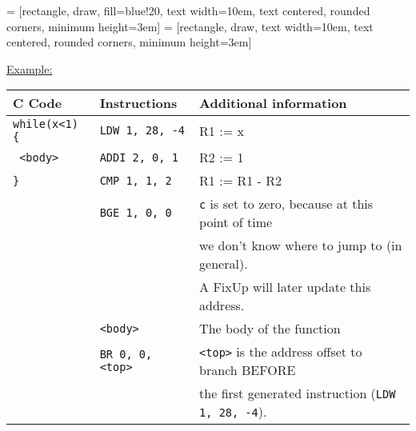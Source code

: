 
 = [rectangle, draw, fill=blue!20, 
    text width=10em, text centered, rounded corners, minimum height=3em]
 = [rectangle, draw, 
    text width=10em, text centered, rounded corners, minimum height=3em]



\par{
    \noindent
    \underline{Example:}
    \par{
        \noindent
        \begin{tabular}{lll}
            \hline
            C Code                  &   Instructions                &    Additional information                             			\\
            \hline
            \hline
            \rowcolor{blue!25}                
            \texttt{while(x<1) \{}	&   \texttt{LDW 1, 28, -4}     	&   R1 := x                               							\\
            \rowcolor{blue!25}
            \texttt{{  }<body>}		&   \texttt{ADDI 2, 0, 1}       &   R2 := 1                                             			\\
            \rowcolor{blue!25}
            \texttt{\}}				&   \texttt{CMP 1, 1, 2}        &   R1 := R1 - R2                                    				\\
			\rowcolor{blue!25}
									&	\texttt{BGE 1, 0, 0}		&	\texttt{c} is set to zero, because at this point of time		\\
			\rowcolor{blue!25}
									&								&	we don't know where to jump to (in general).					\\
			\rowcolor{blue!25}
									&								&	A FixUp will later update this address.							\\
			\rowcolor{blue!25}
									&	\texttt{<body>}				&	The body of the function										\\
			\rowcolor{blue!25}
									&	\texttt{BR 0, 0, <top>}		&	\texttt{<top>} is the address offset to branch BEFORE 			\\
			\rowcolor{blue!25}
									&								&	the first generated instruction (\texttt{LDW 1, 28, -4}).		\\
            \hline
        \end{tabular}
    }    
}

